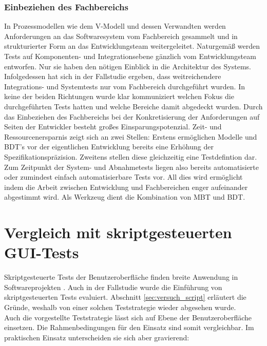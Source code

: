 \subsubsection{Einbeziehen des Fachbereichs}
In Prozessmodellen wie dem V-Modell und dessen Verwandten \cite{hohn_v-modell_2008} werden Anforderungen an das Softwaresystem vom Fachbereich gesammelt und in strukturierter Form an das Entwicklungsteam weitergeleitet. Naturgemäß werden Tests auf Komponenten- und Integrationsebene gänzlich vom Entwicklungsteam entworfen. Nur sie haben den nötigen Einblick in die Architektur des Systems. Infolgedessen hat sich in der Fallstudie ergeben, dass weitreichendere Integrations- und Systemtests nur vom Fachbereich durchgeführt wurden. In keine der beiden Richtungen wurde klar kommuniziert welchen Fokus die durchgeführten Tests hatten und welche Bereiche damit abgedeckt wurden. Durch das Einbeziehen des Fachbereichs bei der Konkretisierung der Anforderungen auf Seiten der Entwickler besteht großes Einsparungspotenzial. Zeit- und Ressourcenersparnis zeigt sich an zwei Stellen: Erstens ermöglichen Modelle und \Gls{BDT}'s vor der eigentlichen Entwicklung bereits eine Erhöhung der Spezifikationspräzision. Zweitens stellen diese gleichzeitig eine Testdefintion dar. Zum Zeitpunkt der System- und Abnahmetests liegen also bereits automatisierte oder zumindest einfach automatisierbare Tests vor. All dies wird ermöglicht indem die Arbeit zwischen Entwicklung und Fachbereichen enger aufeinander abgestimmt wird. Als Werkzeug dient die Kombination von \Gls{MBT} und \Gls{BDT}.

\section{Vergleich mit skriptgesteuerten GUI-Tests}
Skriptgesteuerte Tests der Benutzeroberfläche finden breite Anwendung in Softwareprojekten \cite{graham_experiences_2012}. Auch in der Fallstudie wurde die Einführung von skriptgesteuerten Tests evaluiert. Abschnitt \ref{sec:versuch_script} erläutert die Gründe, weshalb von einer solchen Teststrategie wieder abgesehen wurde.\\
Auch die vorgestellte Teststrategie lässt sich auf Ebene der Benutzeroberfläche einsetzen. Die Rahmenbedingungen für den Einsatz sind somit vergleichbar. Im praktischen Einsatz unterscheiden sie sich aber gravierend:


